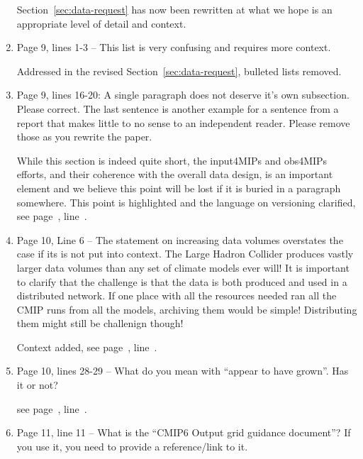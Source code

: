 \documentclass[gmd,manuscript]{copernicus}
\newcommand{\plref}[1]{see page~\pageref{p-#1}, line~\lineref{l-#1}.}
\newenvironment{answer}{\color{blue}}{}
\begin{document}
\begin{enumerate}[label=RC3-\arabic*,leftmargin=*]
  \begin{answer}
    Section~\ref{sec:data-request} has now been rewritten at what we
    hope is an appropriate level of detail and context.
  \end{answer}
\item Page 9, lines 1-3 -- This list is very confusing and requires
  more context.

  \begin{answer}
    Addressed in the revised Section~\ref{sec:data-request}, bulleted
    lists removed.
  \end{answer}
\item Page 9, lines 16-20: A single paragraph does not deserve it’s own
  subsection. Please correct. The last sentence is another example for
  a sentence from a report that makes little to no sense to an
  independent reader. Please remove those as you rewrite the paper.

  \begin{answer}
    While this section is indeed quite short, the input4MIPs and
    obs4MIPs efforts, and their coherence with the overall data
    design, is an important element and we believe this point will be
    lost if it is buried in a paragraph somewhere. This point is
    highlighted and the language on versioning clarified,
    \plref{RC3-9}
  \end{answer}
\item Page 10, Line 6 -- The statement on increasing data volumes
  overstates the case if its is not put into context. The Large Hadron
  Collider produces vastly larger data volumes than any set of climate
  models ever will! It is important to clarify that the challenge is
  that the data is both produced and used in a distributed network. If
  one place with all the resources needed ran all the CMIP runs from
  all the models, archiving them would be simple! Distributing them
  might still be challenign though!

  \begin{answer}
    Context added, \plref{RC3-10}
  \end{answer}
\item Page 10, lines 28-29 -- What do you mean with “appear to have
  grown”. Has it or not?

  \begin{answer}
    \plref{RC3-11}
  \end{answer}
\item Page 11, line 11 -- What is the “CMIP6 Output grid guidance
  document”? If you use it, you need to provide a reference/link to
  it.


\end{enumerate}
\end{document}
